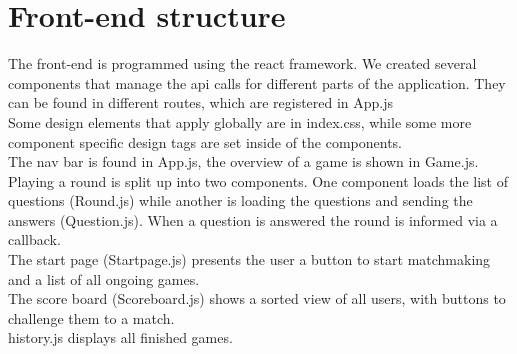 \chapter{Front-end structure}
The front-end is programmed using the react framework. We created several components that manage the api calls for different parts of the application. They can be found in different routes, which are registered in App.js\\
Some design elements that apply globally are in index.css, while some more component specific design tags are set inside of the components.\\

 The nav bar is found in App.js, the overview of a game is shown in Game.js. Playing a round is split up into two components. One component loads the list of questions (Round.js) while another is loading the questions and sending the answers (Question.js). When a question is answered the round is informed via a callback.\\
 The start page (Startpage.js) presents the user a button to start matchmaking and a list of all ongoing games.\\
 The score board (Scoreboard.js) shows a sorted view of all users, with buttons to challenge them to a match.\\
 history.js displays all finished games.